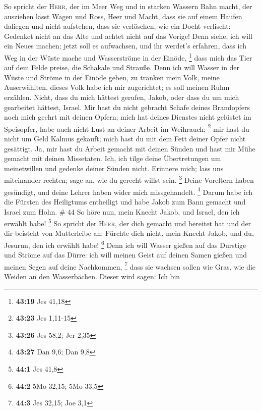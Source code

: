  So spricht der \textsc{Herr}, der im Meer Weg und in
starken Wassern Bahn macht,  der ausziehen lässt Wagen
und Ross, Heer und Macht, dass sie auf einem Haufen daliegen und nicht
aufstehen, dass sie verlöschen, wie ein Docht verlischt: 
Gedenket nicht an das Alte und achtet nicht auf das Vorige!
 Denn siehe, ich will ein Neues machen; jetzt soll es
aufwachsen, und ihr werdet's erfahren, dass ich Weg in der Wüste mache
und Wasserströme in der Einöde, \footnote{\textbf{43:19} Jes 41,18}
 dass mich das Tier auf dem Felde preise, die Schakale
und Strauße. Denn ich will Wasser in der Wüste und Ströme in der Einöde
geben, zu tränken mein Volk, meine Auserwählten.  dieses
Volk habe ich mir zugerichtet; es soll meinen Ruhm erzählen.
 Nicht, dass du mich hättest gerufen, Jakob, oder dass du
um mich gearbeitet hättest, Israel.  Mir hast du nicht
gebracht Schafe deines Brandopfers noch mich geehrt mit deinen Opfern;
mich hat deines Dienstes nicht gelüstet im Speisopfer, habe auch nicht
Lust an deiner Arbeit im Weihrauch; \footnote{\textbf{43:23} Jes 1,11-15}
 mir hast du nicht um Geld Kalmus gekauft; mich hast du
mit dem Fett deiner Opfer nicht gesättigt. Ja, mir hast du Arbeit
gemacht mit deinen Sünden und hast mir Mühe gemacht mit deinen
Missetaten.  Ich, ich tilge deine Übertretungen um
meinetwillen und gedenke deiner Sünden nicht.  Erinnere
mich; lass uns miteinander rechten; sage an, wie du gerecht willst sein.
\footnote{\textbf{43:26} Jes 58,2; Jer 2,35}  Deine
Voreltern haben gesündigt, und deine Lehrer haben wider mich
missgehandelt. \footnote{\textbf{43:27} Dan 9,6; Dan 9,8}
 Darum habe ich die Fürsten des Heiligtums entheiligt und
habe Jakob zum Bann gemacht und Israel zum Hohn. \# 44  So
höre nun, mein Knecht Jakob, und Israel, den ich erwählt habe!
\footnote{\textbf{44:1} Jes 41,8}  So spricht der
\textsc{Herr}, der dich gemacht und bereitet hat und der dir beisteht
von Mutterleibe an: Fürchte dich nicht, mein Knecht Jakob, und du,
Jesurun, den ich erwählt habe! \footnote{\textbf{44:2} 5Mo 32,15; 5Mo
  33,5}  Denn ich will Wasser gießen auf das Durstige und
Ströme auf das Dürre: ich will meinen Geist auf deinen Samen gießen und
meinen Segen auf deine Nachkommen, \footnote{\textbf{44:3} Jes 32,15;
  Joe 3,1}  dass sie wachsen sollen wie Gras, wie die
Weiden an den Wasserbächen.  Dieser wird sagen: Ich bin

